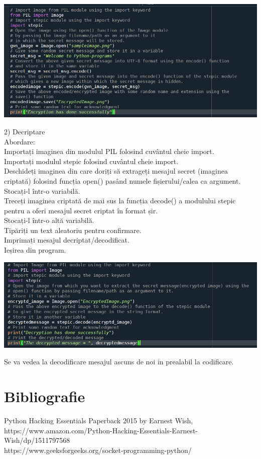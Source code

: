 \documentclass[oneside,20pt]{article}          %
\begin{document}
 \begin{center}
\includegraphics[height = 4 cm]{11.png}
\end{center}
2) Decriptare\\

Abordare:\\

Importați imaginea din modulul PIL folosind cuvântul cheie import.\\
Importați modulul stepic folosind cuvântul cheie import.\\
Deschideți imaginea din care doriți să extrageți mesajul secret (imaginea criptată) folosind funcția open() pasând numele fișierului/calea ca argument.\\
Stocați-l într-o variabilă.\\
Treceți imaginea criptată de mai sus la funcția decode() a modulului stepic pentru a oferi mesajul secret criptat în format șir.\\
Stocați-l într-o altă variabilă.\\
Tipăriți un text aleatoriu pentru confirmare.\\
 Imprimați mesajul decriptat/decodificat.\\
Ieșirea din program.\\
 \begin{center}
\includegraphics[height = 4 cm]{12.png}
\end{center}
 Se va vedea la decodificare mesajul ascuns de noi in prealabil la codificare.
\section{Bibliografie}
Python Hacking Essentials Paperback 2015 by Earnest Wish, \\
https://www.amazon.com/Python-Hacking-Essentials-Earnest-Wish/dp/1511797568\\
https://www.geeksforgeeks.org/socket-programming-python/
\end{document}
